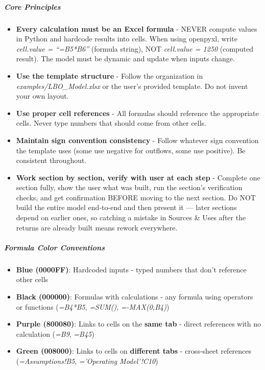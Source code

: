 \documentclass[11pt]{article}
\begin{document}
\subparagraph{Core Principles}\mbox{}\par
\begin{itemize}[leftmargin=*,itemsep=2pt,topsep=2pt]
\item {} \textbf{Every calculation must be an Excel formula} - NEVER compute values in Python and hardcode results into cells. When using openpyxl, write \emph{cell.value = ``=B5*B6''} (formula string), NOT \emph{cell.value = 1250} (computed result). The model must be dynamic and update when inputs change.
\item {} \textbf{Use the template structure} - Follow the organization in \emph{examples/LBO\_\allowbreak{}Model.xlsx} or the user's provided template. Do not invent your own layout.
\item {} \textbf{Use proper cell references} - All formulas should reference the appropriate cells. Never type numbers that should come from other cells.
\item {} \textbf{Maintain sign convention consistency} - Follow whatever sign convention the template uses (some use negative for outflows, some use positive). Be consistent throughout.
\item {} \textbf{Work section by section, verify with user at each step} - Complete one section fully, show the user what was built, run the section's verification checks, and get confirmation BEFORE moving to the next section. Do NOT build the entire model end-to-end and then present it — later sections depend on earlier ones, so catching a mistake in Sources \& Uses after the returns are already built means rework everywhere.
\end{itemize}

\subparagraph{Formula Color Conventions}\mbox{}\par
\begin{itemize}[leftmargin=*,itemsep=2pt,topsep=2pt]
\item {} \textbf{Blue (0000FF)}: Hardcoded inputs - typed numbers that don't reference other cells
\item {} \textbf{Black (000000)}: Formulas with calculations - any formula using operators or functions (\emph{=B4*B5}, \emph{=SUM()}, \emph{=-MAX(0,B4)})
\item {} \textbf{Purple (800080)}: Links to cells on the \textbf{same tab} - direct references with no calculation (\emph{=B9}, \emph{=B45})
\item {} \textbf{Green (008000)}: Links to cells on \textbf{different tabs} - cross-sheet references (\emph{=Assumptions!B5}, \emph{='Operating Model'!C10})
\end{itemize}
\end{document}
